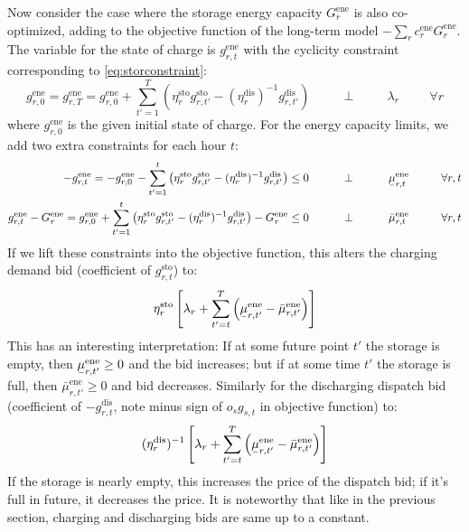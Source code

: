 \documentclass[final,3p]{elsarticle}
\def\l{\lambda} \def\K{\kappa} \def\m{\mu} \def\G{\Gamma} \def\d{\partial}
\begin{document}
Now consider the case where the storage energy capacity $G^{\textrm{ene}}_r$ is
also co-optimized, adding to the objective function of the long-term model
$-\sum_r c^{\textrm{ene}}_r G^{\textrm{ene}}_r$. The variable for the state of
charge is $g^{\textrm{ene}}_{r,t}$ with the cyclicity constraint corresponding to
\eqref{eq:storconstraint}:
\begin{equation}
  g^{\textrm{ene}}_{r,0} = g^{\textrm{ene}}_{r,T} = g^{\textrm{ene}}_{r,0} + \sum_{t'=1}^T \left( \eta^{\textrm{sto}}_r g^{\textrm{sto}}_{r,t'} - (\eta^{\textrm{dis}}_r)^{-1} g^{\textrm{dis}}_{r,t'} \right)   \hspace{1cm}\perp \hspace{1cm} \lambda_{r} \hspace{1cm} \forall r
\end{equation}
where $g^{\textrm{ene}}_{r,0}$ is the given initial state of charge.
For the energy capacity limits, we add two extra constraints for each hour
$t$:
\begin{align}
  -g^{\textrm{ene}}_{r,t} =   -g^{\textrm{ene}}_{r,0} - \sum_{t'=1}^t \left( \eta^{\textrm{sto}}_r g^{\textrm{sto}}_{r,t'} - (\eta^{\textrm{dis}}_r)^{-1} g^{\textrm{dis}}_{r,t'} \right) \leq  0  \hspace{1cm}\perp \hspace{1cm} \ubar{\mu}^{\textrm{ene}}_{r,t} \hspace{1cm} \forall r,t \label{eq:enelower} \\
  g^{\textrm{ene}}_{r,t} - G^{\textrm{ene}}_r = g^{\textrm{ene}}_{r,0} + \sum_{t'=1}^t \left( \eta^{\textrm{sto}}_r g^{\textrm{sto}}_{r,t'} - (\eta^{\textrm{dis}}_r)^{-1} g^{\textrm{dis}}_{r,t'} \right) - G^{\textrm{ene}}_r \leq  0  \hspace{1cm}\perp \hspace{1cm} \bar{\mu}^{\textrm{ene}}_{r,t} \hspace{1cm} \forall r,t \label{eq:eneupper}
\end{align}
If we lift these constraints into the objective function, this alters the
charging demand bid (coefficient of  $g^{\textrm{sto}}_{r,t}$) to:
\begin{equation}
  \eta^{\textrm{sto}}_r \left[ \l_r + \sum_{t'=t}^T \left( \ubar{\mu}^{\textrm{ene}}_{r,t'} -\bar{\mu}^{\textrm{ene}}_{r,t'}  \right) \right]
\end{equation}
This has an interesting interpretation: If at some future point $t'$ the storage
is empty, then $\ubar{\mu}^{\textrm{ene}}_{r,t'} \geq 0$  and the bid increases;
but if at some time $t'$ the storage is full, then
$\bar{\mu}^{\textrm{ene}}_{r,t'} \geq 0$ and bid decreases.
Similarly for the discharging dispatch bid (coefficient of
$-g^{\textrm{dis}}_{r,t}$, note minus sign of $o_sg_{s,t}$ in objective
function) to:
\begin{equation}
  (\eta^{\textrm{dis}}_r)^{-1}\left[ \l_r + \sum_{t'=t}^T \left(\ubar{\mu}^{\textrm{ene}}_{r,t'} - \bar{\mu}^{\textrm{ene}}_{r,t'}  \right)\right]
\end{equation}
If the storage is nearly empty, this increases the price of the dispatch bid; if
it's full in future, it decreases the price. It is noteworthy that like in the
previous section, charging and discharging bids are same up to a constant.
\end{document}
